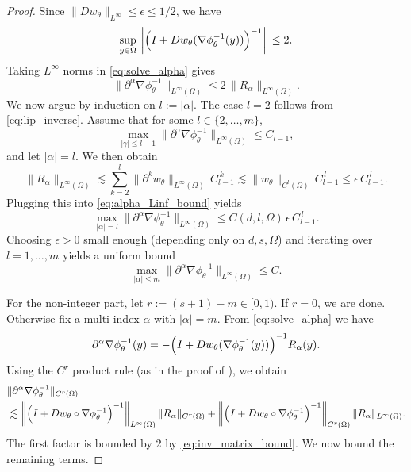 \documentclass{article}
\newcommand{\1}{\mathds{1}}
\theoremstyle{plain}
\theoremstyle{definition}
\theoremstyle{remark}
\begin{document}
\begin{proof}
Since $\|Dw_\theta\|_{L^\infty}\le\epsilon\le 1/2$, we have
\begin{equation}
\label{eq:inv_matrix_bound}
\sup_{y\in\Omega}\left\|\Bigl(I+Dw_\theta(\nabla\phi_\theta^{-1}(y))\Bigr)^{-1}\right\|
\le 2.
\end{equation}
Taking $L^\infty$ norms in \eqref{eq:solve_alpha} gives
\begin{equation}
\label{eq:alpha_Linf_bound}
\|\partial^\alpha \nabla\phi_\theta^{-1}\|_{L^\infty(\Omega)}
\le
2\,\|R_\alpha\|_{L^\infty(\Omega)}.
\end{equation}
We now argue by induction on $l:=|\alpha|$. The case $l=2$ follows from \eqref{eq:lip_inverse}.
Assume that for some $l\in\{2,\dots,m\}$,
\begin{equation}
\label{eq:induction_hyp}
\max_{|\gamma|\le l-1}\|\partial^\gamma \nabla\phi_\theta^{-1}\|_{L^\infty(\Omega)} \le C_{l-1},
\end{equation}
and let $|\alpha|=l$. We then obtain
\begin{equation}
\|R_\alpha\|_{L^\infty(\Omega)}
\lesssim
\sum_{k=2}^l
\|\partial^k w_\theta\|_{L^\infty(\Omega)}\,
C_{l-1}^{\,k}
\lesssim
\|w_\theta\|_{C^l(\Omega)}\,C_{l-1}^{\,l}
\le
\epsilon\,C_{l-1}^{\,l}.
\end{equation}
Plugging this into \eqref{eq:alpha_Linf_bound} yields
\begin{equation}
\max_{|\alpha|=l}\|\partial^\alpha \nabla\phi_\theta^{-1}\|_{L^\infty(\Omega)}
\le
C(d,l,\Omega)\,\epsilon\,C_{l-1}^{\,l}.
\end{equation}
Choosing $\epsilon>0$ small enough (depending only on $d,s,\Omega$) and iterating over $l=1,\dots,m$ yields a uniform bound
\begin{equation}
\label{eq:Cm_bound_inverse}
\max_{|\alpha|\le m}\|\partial^\alpha \nabla\phi_\theta^{-1}\|_{L^\infty(\Omega)} \le C.
\end{equation}

For the non-integer part, let
$
r := (s+1) - m \in [0,1).
$
If $r=0$, we are done. Otherwise fix a multi-index $\alpha$ with $|\alpha|=m$.
From \eqref{eq:solve_alpha} we have
\begin{equation}
\label{eq:alpha_product_clean}
\partial^\alpha \nabla\phi_\theta^{-1}(y)
=
-\Bigl(I + Dw_\theta(\nabla\phi_\theta^{-1}(y))\Bigr)^{-1} R_\alpha(y).
\end{equation}
Using the $C^r$ product rule (as in the proof of ), we obtain
\begin{equation}
\label{eq:Cr_product_bound}
\begin{aligned}
&\|\partial^\alpha \nabla\phi_\theta^{-1}\|_{C^r(\Omega)} \\
&\lesssim
\left\|\Bigl(I+Dw_\theta\circ\nabla\phi_\theta^{-1}\Bigr)^{-1}\right\|_{L^\infty(\Omega)}\|R_\alpha\|_{C^r(\Omega)}
+
\left\|\Bigl(I+Dw_\theta\circ\nabla\phi_\theta^{-1}\Bigr)^{-1}\right\|_{C^r(\Omega)}\|R_\alpha\|_{L^\infty(\Omega)}.
\end{aligned}
\end{equation}
The first factor is bounded by $2$ by \eqref{eq:inv_matrix_bound}. We now bound the remaining terms.


\end{proof}
\end{document}
